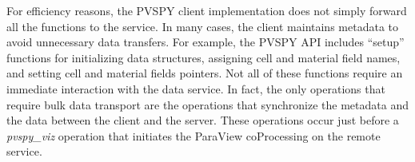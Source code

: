 



For efficiency reasons, the \intransit PVSPY client implementation does not
simply forward all the functions to the service.  In many cases, the client
maintains metadata to avoid unnecessary data transfers.  For example, the PVSPY
API includes ``setup'' functions for initializing data structures, assigning
cell and material field names, and setting cell and material fields pointers.
Not all of these functions require an immediate interaction with the data
service.  In fact, the only operations that require bulk data transport are
the operations that synchronize the metadata and the data between the client 
and the server.  These operations occur just before a \emph{pvspy\_viz} operation
that initiates the ParaView coProcessing on the remote service. 

